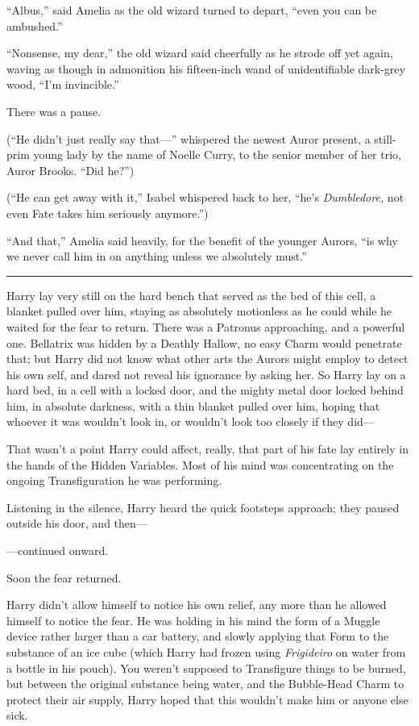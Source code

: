 ``Albus,'' said Amelia as the old wizard turned to depart, ``even you
can be ambushed.''

``Nonsense, my dear,'' the old wizard said cheerfully as he strode off
yet again, waving as though in admonition his fifteen-inch wand of
unidentifiable dark-grey wood, ``I'm invincible.''

There was a pause.

(``He didn't just really say that---'' whispered the newest Auror
present, a still-prim young lady by the name of Noelle Curry, to the
senior member of her trio, Auror Brooks. ``Did he?'')

(``He can get away with it,'' Isabel whispered back to her, ``he's
\emph{Dumbledore,} not even Fate takes him seriously anymore.'')

``And that,'' Amelia said heavily, for the benefit of the younger
Aurors, ``is why we never call him in on anything unless we absolutely
must.''

\begin{center}\rule{3in}{0.4pt}\end{center}

Harry lay very still on the hard bench that served as the bed of this
cell, a blanket pulled over him, staying as absolutely motionless as he
could while he waited for the fear to return. There was a Patronus
approaching, and a powerful one. Bellatrix was hidden by a Deathly
Hallow, no easy Charm would penetrate that; but Harry did not know what
other arts the Aurors might employ to detect his own self, and dared not
reveal his ignorance by asking her. So Harry lay on a hard bed, in a
cell with a locked door, and the mighty metal door locked behind him, in
absolute darkness, with a thin blanket pulled over him, hoping that
whoever it was wouldn't look in, or wouldn't look too closely if they
did---

That wasn't a point Harry could affect, really, that part of his fate
lay entirely in the hands of the Hidden Variables. Most of his mind was
concentrating on the ongoing Transfiguration he was performing.

Listening in the silence, Harry heard the quick footsteps approach; they
paused outside his door, and then---

---continued onward.

Soon the fear returned.

Harry didn't allow himself to notice his own relief, any more than he
allowed himself to notice the fear. He was holding in his mind the form
of a Muggle device rather larger than a car battery, and slowly applying
that Form to the substance of an ice cube (which Harry had frozen using
\emph{Frigideiro} on water from a bottle in his pouch). You weren't
supposed to Transfigure things to be burned, but between the original
substance being water, and the Bubble-Head Charm to protect their air
supply, Harry hoped that this wouldn't make him or anyone else sick.


